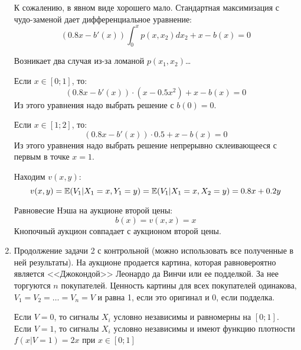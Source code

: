 \begin{enumerate}


К сожалению, в явном виде хорошего мало. Стандартная максимизация с чудо-заменой дает дифференциальное уравнение:
\begin{equation}
(0.8x-b'(x))\int_{0}^{x}p(x,x_{2})dx_{2}+x-b(x)=0
\end{equation}

Возникает два случая из-за ломаной $ p(x_{1},x_{2}) $\ldots 

Если $ x\in [0;1] $, то:
\begin{equation}
(0.8x-b'(x))\cdot (x-0.5x^{2})+x-b(x)=0
\end{equation}
Из этого уравнения надо выбрать решение с $ b(0)=0 $.

Если $ x\in [1;2] $, то:
\begin{equation}
(0.8x-b'(x))\cdot 0.5+x-b(x)=0
\end{equation}
Из этого уравнения надо выбрать решение непрерывно склеивающееся с первым в точке $x=1$.


Находим $ v(x,y) $:
\begin{equation}
v(x,y)=\mathbb{E}(V_{1}|X_{1}=x,Y_{1}=y)=\mathbb{E}(V_{1}|X_{1}=x,X_{2}=y)=0.8x+0.2y
\end{equation}

Равновесие Нэша на аукционе второй цены:
\begin{equation}
b(x)=v(x,x)=x
\end{equation}
Кнопочный аукцион совпадает с аукционом второй цены. 


\item Продолжение задачи 2 с контрольной (можно использовать все полученные в ней результаты).
На аукционе продается картина, которая равновероятно является <<Джокондой>> Леонардо да Винчи или ее подделкой. За нее торгуются $ n $ покупателей. Ценность картины для всех покупателей одинакова, $ V_{1}=V_{2}=\ldots =V_{n}=V $ и равна 1, если это оригинал и 0, если подделка.

Если $ V=0 $, то сигналы $ X_{i} $ условно независимы и равномерны на $ [0;1] $. Если $ V=1 $, то сигналы $ X_{i} $ условно независимы и имеют функцию плотности $ f(x|V=1)=2x $ при  $x\in [0;1] $


\end{enumerate}
